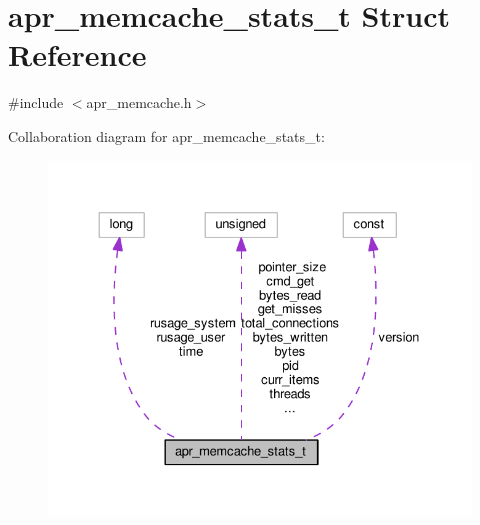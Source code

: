 \hypertarget{structapr__memcache__stats__t}{}\section{apr\+\_\+memcache\+\_\+stats\+\_\+t Struct Reference}
\label{structapr__memcache__stats__t}


{\ttfamily \#include $<$apr\+\_\+memcache.\+h$>$}



Collaboration diagram for apr\+\_\+memcache\+\_\+stats\+\_\+t\+:
\nopagebreak
\begin{figure}[H]
\begin{center}
\leavevmode
\includegraphics[width=330pt]{structapr__memcache__stats__t__coll__graph}
\end{center}
\end{figure}
